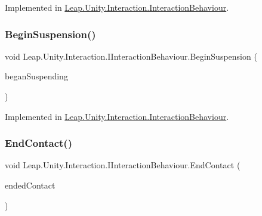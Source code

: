 Implemented in \mbox{\hyperlink{class_leap_1_1_unity_1_1_interaction_1_1_interaction_behaviour_addb5ab253e3f6556c278f205ada2f509}{Leap.\+Unity.\+Interaction.\+Interaction\+Behaviour}}.

\mbox{\label{interface_leap_1_1_unity_1_1_interaction_1_1_i_interaction_behaviour_a2e68a48e5b84237fa5963406b08e3eba}} 
\subsubsection{\texorpdfstring{BeginSuspension()}{BeginSuspension()}}
{\footnotesize\ttfamily void Leap.\+Unity.\+Interaction.\+I\+Interaction\+Behaviour.\+Begin\+Suspension (\begin{DoxyParamCaption}\item[{\mbox{\hyperlink{class_leap_1_1_unity_1_1_interaction_1_1_interaction_controller}{Interaction\+Controller}}}]{began\+Suspending }\end{DoxyParamCaption})}



Implemented in \mbox{\hyperlink{class_leap_1_1_unity_1_1_interaction_1_1_interaction_behaviour_a31664a1bceac985662d8ed4796af5250}{Leap.\+Unity.\+Interaction.\+Interaction\+Behaviour}}.

\mbox{\label{interface_leap_1_1_unity_1_1_interaction_1_1_i_interaction_behaviour_a5a85de0cc00d9c393b84c7fec456e506}} 
\subsubsection{\texorpdfstring{EndContact()}{EndContact()}}
{\footnotesize\ttfamily void Leap.\+Unity.\+Interaction.\+I\+Interaction\+Behaviour.\+End\+Contact (\begin{DoxyParamCaption}\item[{List$<$ \mbox{\hyperlink{class_leap_1_1_unity_1_1_interaction_1_1_interaction_controller}{Interaction\+Controller}} $>$}]{ended\+Contact }\end{DoxyParamCaption})}



